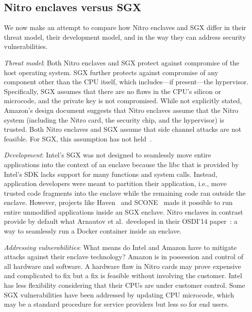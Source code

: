 \subsection{Nitro enclaves versus SGX}%
\label{sec:comparison}

We now make an attempt to compare how Nitro enclaves and SGX differ in their
threat model, their development model, and in the way they can address security
vulnerabilities.

\emph{Threat model}:
Both Nitro enclaves and SGX protect against compromise of the host operating
system.  SGX further protects against compromise of any component other than the
CPU itself, which includes---if present---the hypervisor.  Specifically, SGX
assumes that there are no flaws in the CPU's silicon or microcode, and the
private key is not compromised.  While not explicitly stated, Amazon's design
document suggests that Nitro enclaves assume that the Nitro system (including
the Nitro card, the security chip, and the hypervisor) is trusted.  Both Nitro
enclaves and SGX assume that side channel attacks are not feasible.  For SGX,
this assumption has not held~\cite{Nilsson20a,Fei2021a}.

\emph{Development}:
Intel's SGX was not designed to seamlessly move entire applications into the
context of an enclave because the libc that is provided by Intel's SDK lacks
support for many functions and system calls.  Instead, application developers
were meant to partition their application, i.e., move trusted code fragments
into the enclave while the remaining code ran outside the enclave.  However,
projects like Haven~\cite{Baumann2014a} and SCONE~\cite{Arnautov2016a} made it
possible to run entire unmodified applications inside an SGX enclave.  Nitro
enclaves in contrast provide by default what Arnautov et al.\ developed in their
OSDI'14 paper~\cite{Arnautov2016a}: a way to seamlessly run a Docker container
inside an enclave.

\emph{Addressing vulnerabilities}:
What means do Intel and Amazon have to mitigate attacks against their enclave
technology?  Amazon is in possession and control of all hardware and software.
A hardware flaw in Nitro cards may prove expensive and complicated to fix but a
fix is feasible without involving the customer.  Intel has less flexibility
considering that their CPUs are under customer control.  Some SGX
vulnerabilities have been addressed by updating CPU microcode, which may be a
standard procedure for service providers but less so for end users.
